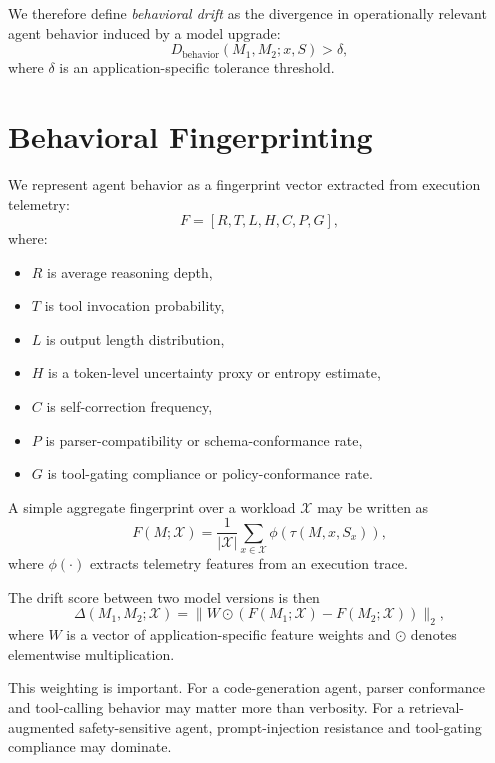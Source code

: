 \documentclass[11pt]{article}
\begin{document}
We therefore define \emph{behavioral drift} as the divergence in operationally relevant agent behavior induced by a model upgrade:
\begin{equation}
D_{\mathrm{behavior}}(M_1, M_2; x, S) > \delta,
\end{equation}
where $\delta$ is an application-specific tolerance threshold.

\section{Behavioral Fingerprinting}
We represent agent behavior as a fingerprint vector extracted from execution telemetry:
\begin{equation}
F = [R, T, L, H, C, P, G],
\end{equation}
where:
\begin{itemize}[leftmargin=*]
    \item $R$ is average reasoning depth,
    \item $T$ is tool invocation probability,
    \item $L$ is output length distribution,
    \item $H$ is a token-level uncertainty proxy or entropy estimate,
    \item $C$ is self-correction frequency,
    \item $P$ is parser-compatibility or schema-conformance rate,
    \item $G$ is tool-gating compliance or policy-conformance rate.
\end{itemize}

A simple aggregate fingerprint over a workload $\mathcal{X}$ may be written as
\begin{equation}
F(M; \mathcal{X}) = \frac{1}{|\mathcal{X}|} \sum_{x \in \mathcal{X}} \phi(\tau(M, x, S_x)),
\end{equation}
where $\phi(\cdot)$ extracts telemetry features from an execution trace.

The drift score between two model versions is then
\begin{equation}
\Delta(M_1, M_2; \mathcal{X}) = \| W \odot (F(M_1; \mathcal{X}) - F(M_2; \mathcal{X})) \|_2,
\end{equation}
where $W$ is a vector of application-specific feature weights and $\odot$ denotes elementwise multiplication.

This weighting is important. For a code-generation agent, parser conformance and tool-calling behavior may matter more than verbosity. For a retrieval-augmented safety-sensitive agent, prompt-injection resistance and tool-gating compliance may dominate.
\end{document}

